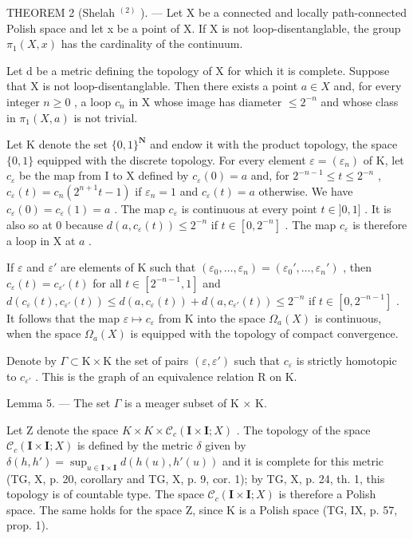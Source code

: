 THEOREM 2 (Shelah \(^{(2)}\) ). --- Let X be a connected and locally path-connected Polish space and let x be a point of X. If X is not loop-disentanglable, the group \(\pi_{1}(X,x)\) has the cardinality of the continuum.

Let d be a metric defining the topology of X for which it is complete. Suppose that X is not loop-disentanglable. Then there exists a point \(a \in X\) and, for every integer \(n \geqslant 0\) , a loop \(c_{n}\) in X whose image has diameter \(\leqslant 2^{-n}\) and whose class in \(\pi_{1}(X, a)\) is not trivial.

Let K denote the set \(\{0,1\}^{\mathbf{N}}\) and endow it with the product topology, the space \(\{0,1\}\) equipped with the discrete topology. For every element \(\varepsilon = (\varepsilon_n)\) of K, let \(c_{\varepsilon}\) be the map from I to X defined by \(c_{\varepsilon}(0) = a\) and, for \(2^{-n - 1} \leqslant t \leqslant 2^{-n}\) , \(c_{\varepsilon}(t) = c_n(2^{n + 1}t - 1)\) if \(\varepsilon_n = 1\) and \(c_{\varepsilon}(t) = a\) otherwise. We have \(c_{\varepsilon}(0) = c_{\varepsilon}(1) = a\) . The map \(c_{\varepsilon}\) is continuous at every point \(t \in ]0,1]\) . It is also so at 0 because \(d(a,c_{\varepsilon}(t)) \leqslant 2^{-n}\) if \(t \in [0,2^{-n}] \) . The map \(c_{\varepsilon}\) is therefore a loop in X at \(a\) .

If \(\varepsilon\) and \(\varepsilon'\) are elements of K such that \((\varepsilon_0, \ldots, \varepsilon_n) = (\varepsilon_0', \ldots, \varepsilon_n')\) , then \(c_{\varepsilon}(t) = c_{\varepsilon'}(t)\) for all \(t \in [2^{-n-1}, 1]\) and \(d(c_{\varepsilon}(t), c_{\varepsilon'}(t)) \leqslant d(a, c_{\varepsilon}(t)) + d(a, c_{\varepsilon'}(t)) \leqslant 2^{-n}\) if \(t \in [0, 2^{-n-1}]\) . It follows that the map \(\varepsilon \mapsto c_{\varepsilon}\) from K into the space \(\Omega_a(X)\) is continuous, when the space \(\Omega_a(X)\) is equipped with the topology of compact convergence.

Denote by \(\Gamma \subset \mathrm{K} \times \mathrm{K}\) the set of pairs \((\varepsilon, \varepsilon')\) such that \(c_{\varepsilon}\) is strictly homotopic to \(c_{\varepsilon'}\) . This is the graph of an equivalence relation R on K.

Lemma 5. --- The set \(\Gamma\) is a meager subset of K × K.

Let Z denote the space \(K \times K \times \mathcal{C}_{c}(\mathbf{I} \times \mathbf{I}; X)\) . The topology of the space \(\mathcal{C}_{c}(\mathbf{I} \times \mathbf{I}; X)\) is defined by the metric \(\delta\) given by \(\delta(h, h') = \sup_{u \in \mathbf{I} \times \mathbf{I}} d(h(u), h'(u))\) and it is complete for this metric (TG, X, p. 20, corollary and TG, X, p. 9, cor. 1); by TG, X, p. 24, th. 1, this topology is of countable type. The space \(\mathcal{C}_{c}(\mathbf{I} \times \mathbf{I}; X)\) is therefore a Polish space. The same holds for the space Z, since K is a Polish space (TG, IX, p. 57, prop. 1).

